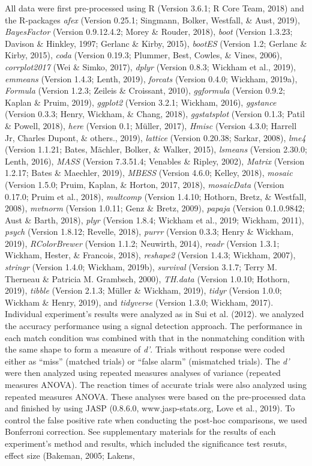 \documentclass[man]{apa6}
\begin{document}
All data were first pre-processed using R (Version 3.6.1; R Core Team, 2018) and the R-packages \emph{afex} (Version 0.25.1; Singmann, Bolker, Westfall, \& Aust, 2019), \emph{BayesFactor} (Version 0.9.12.4.2; Morey \& Rouder, 2018), \emph{boot} (Version 1.3.23; Davison \& Hinkley, 1997; Gerlanc \& Kirby, 2015), \emph{bootES} (Version 1.2; Gerlanc \& Kirby, 2015), \emph{coda} (Version 0.19.3; Plummer, Best, Cowles, \& Vines, 2006), \emph{corrplot2017} (Wei \& Simko, 2017), \emph{dplyr} (Version 0.8.3; Wickham et al., 2019), \emph{emmeans} (Version 1.4.3; Lenth, 2019), \emph{forcats} (Version 0.4.0; Wickham, 2019a), \emph{Formula} (Version 1.2.3; Zeileis \& Croissant, 2010), \emph{ggformula} (Version 0.9.2; Kaplan \& Pruim, 2019), \emph{ggplot2} (Version 3.2.1; Wickham, 2016), \emph{ggstance} (Version 0.3.3; Henry, Wickham, \& Chang, 2018), \emph{ggstatsplot} (Version 0.1.3; Patil \& Powell, 2018), \emph{here} (Version 0.1; Müller, 2017), \emph{Hmisc} (Version 4.3.0; Harrell Jr, Charles Dupont, \& others., 2019), \emph{lattice} (Version 0.20.38; Sarkar, 2008), \emph{lme4} (Version 1.1.21; Bates, Mächler, Bolker, \& Walker, 2015), \emph{lsmeans} (Version 2.30.0; Lenth, 2016), \emph{MASS} (Version 7.3.51.4; Venables \& Ripley, 2002), \emph{Matrix} (Version 1.2.17; Bates \& Maechler, 2019), \emph{MBESS} (Version 4.6.0; Kelley, 2018), \emph{mosaic} (Version 1.5.0; Pruim, Kaplan, \& Horton, 2017, 2018), \emph{mosaicData} (Version 0.17.0; Pruim et al., 2018), \emph{multcomp} (Version 1.4.10; Hothorn, Bretz, \& Westfall, 2008), \emph{mvtnorm} (Version 1.0.11; Genz \& Bretz, 2009), \emph{papaja} (Version 0.1.0.9842; Aust \& Barth, 2018), \emph{plyr} (Version 1.8.4; Wickham et al., 2019; Wickham, 2011), \emph{psych} (Version 1.8.12; Revelle, 2018), \emph{purrr} (Version 0.3.3; Henry \& Wickham, 2019), \emph{RColorBrewer} (Version 1.1.2; Neuwirth, 2014), \emph{readr} (Version 1.3.1; Wickham, Hester, \& Francois, 2018), \emph{reshape2} (Version 1.4.3; Wickham, 2007), \emph{stringr} (Version 1.4.0; Wickham, 2019b), \emph{survival} (Version 3.1.7; Terry M. Therneau \& Patricia M. Grambsch, 2000), \emph{TH.data} (Version 1.0.10; Hothorn, 2019), \emph{tibble} (Version 2.1.3; Müller \& Wickham, 2019), \emph{tidyr} (Version 1.0.0; Wickham \& Henry, 2019), and \emph{tidyverse} (Version 1.3.0; Wickham, 2017). Individual experiment's results were analyzed as in Sui et al. (2012). we analyzed the accuracy performance using a signal detection approach. The performance in each match condition was combined with that in the nonmatching condition with the same shape to form a measure of \emph{d'}. Trials without response were coded either as \enquote{miss} (matched trials) or \enquote{false alarm} (mismatched trials). The \emph{d'} were then analyzed using repeated measures analyses of variance (repeated measures ANOVA). The reaction times of accurate trials were also analyzed using repeated measures ANOVA. These analyses were based on the pre-processed data and finished by using JASP (0.8.6.0, www.jasp-stats.org, Love et al., 2019). To control the false positive rate when conducting the post-hoc comparisons, we used Bonferroni correction. See supplementary materials for the results of each experiment's method and results, which included the significance test resuts, effect size (Bakeman, 2005; Lakens, 
\end{document}
